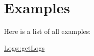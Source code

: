 \section{\-Examples}
\-Here is a list of all examples\-:\begin{DoxyCompactItemize}
\item 
\hyperlink{_logs_1_1get_logs-example}{\-Logs\-::get\-Logs}
\end{DoxyCompactItemize}

